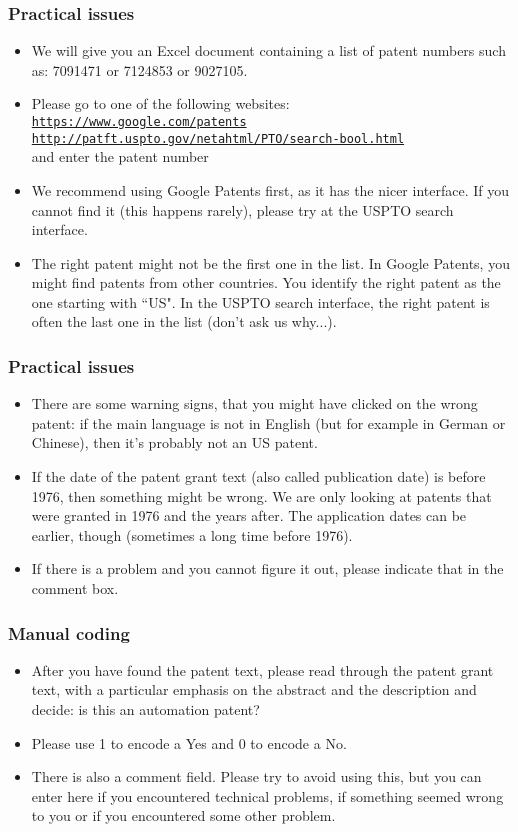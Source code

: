 \documentclass[10pt]{beamer}
\begin{document}
\begin{frame}\frametitle{Practical issues}
	\begin{itemize}	
	\item We will give you an Excel document containing a list of patent numbers such as: 7091471 or 7124853 or 9027105.
	\item Please go to one of the following websites: \\[0.1cm]
 \href{https://www.google.com/patents}{\texttt{https://www.google.com/patents}}\\[0.1cm]
\href{http://patft.uspto.gov/netahtml/PTO/search-bool.html}{\texttt{http://patft.uspto.gov/netahtml/PTO/search-bool.html}}\\[0.1cm]
	and enter the patent number
	\item We recommend using Google Patents first, as it has the nicer interface. If you cannot find it (this happens rarely), please try at the USPTO search interface.
	\item The right patent might not be the first one in the list. In Google Patents, you might find patents from other countries. You identify the right patent as the one starting with ``US". In the USPTO search interface, the right patent is often the last one in the list (don't ask us why...).
	\end{itemize}
\end{frame}

\begin{frame}\frametitle{Practical issues}
	\begin{itemize}	
	\item There are some warning signs, that you might have clicked on the wrong patent: if the main language is not in English (but for example in German or Chinese), then it's probably not an US patent.
	\item If the date of the patent grant text (also called publication date) is before 1976, then something might be wrong. We are only looking at patents that were granted in 1976 and the years after. The application dates can be earlier, though (sometimes a long time before 1976). 
	\item If there is a problem and you cannot figure it out, please indicate that in the comment box.
	\end{itemize}
\end{frame}


\begin{frame}\frametitle{Manual coding}
	\begin{itemize}	
	\item After you have found the patent text, please read through the patent grant text, with a particular emphasis on the abstract and the description and decide: is this an automation patent?
	\item Please use 1 to encode a Yes and 0 to encode a No.
	\item There is also a comment field. Please try to avoid using this, but you can enter here if you encountered technical problems, if something seemed wrong to you or if you encountered some other problem.
	\end{itemize}
\end{frame}
\end{document}
